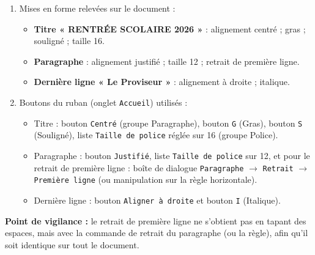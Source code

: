 \documentclass[11pt]{article}
\begin{document}
\begin{corrige}
\begin{enumerate}
\item Mises en forme relevées sur le document :
\begin{itemize}
\item \textbf{Titre « RENTRÉE SCOLAIRE 2026 »} : alignement centré ; gras ; souligné ; taille 16.
\item \textbf{Paragraphe} : alignement justifié ; taille 12 ; retrait de première ligne.
\item \textbf{Dernière ligne « Le Proviseur »} : alignement à droite ; italique.
\end{itemize}
\item Boutons du ruban (onglet \texttt{Accueil}) utilisés :
\begin{itemize}
\item Titre : bouton \texttt{Centré} (groupe Paragraphe), bouton \texttt{G} (Gras), bouton \texttt{S} (Souligné), liste \texttt{Taille de police} réglée sur 16 (groupe Police).
\item Paragraphe : bouton \texttt{Justifié}, liste \texttt{Taille de police} sur 12, et pour le retrait de première ligne : boîte de dialogue \texttt{Paragraphe} $\to$ \texttt{Retrait} $\to$ \texttt{Première ligne} (ou manipulation sur la règle horizontale).
\item Dernière ligne : bouton \texttt{Aligner à droite} et bouton \texttt{I} (Italique).
\end{itemize}
\end{enumerate}
\textbf{Point de vigilance :} le retrait de première ligne ne s'obtient pas en tapant des espaces, mais avec la commande de retrait du paragraphe (ou la règle), afin qu'il soit identique sur tout le document.
\end{corrige}
\end{document}
